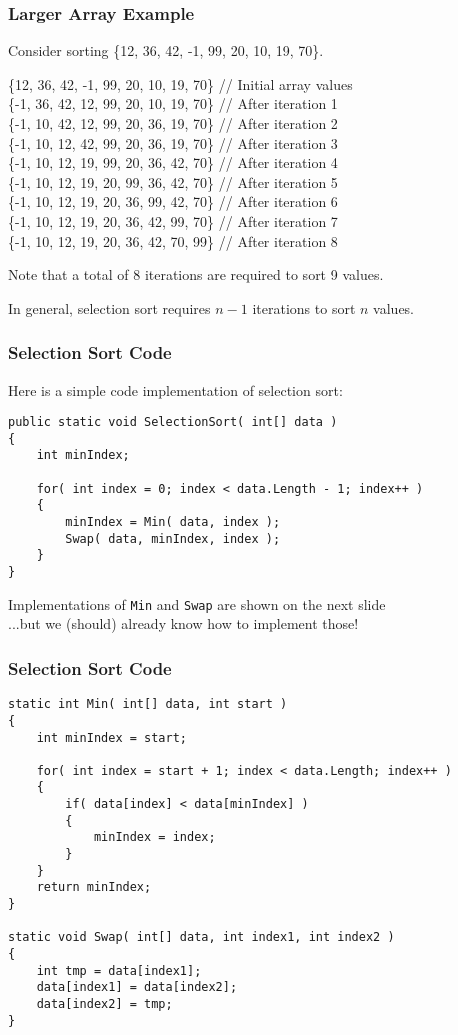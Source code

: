 \begin{frame}
\frametitle{Larger Array Example}

Consider sorting \{12, 36, 42, -1, 99, 20, 10, 19, 70\}.

	\{12, 36, 42, -1, 99, 20, 10, 19, 70\} 	// Initial array values\\
	\{\alert{-1}, 36, 42, 12, 99, 20, 10, 19, 70\}	// After iteration 1\\
	\{\alert{-1, 10}, 42, 12, 99, 20, 36, 19, 70\}	// After iteration 2\\
	\{\alert{-1, 10, 12}, 42, 99, 20, 36, 19, 70\}	// After iteration 3\\
	\{\alert{-1, 10, 12, 19}, 99, 20, 36, 42, 70\}	// After iteration 4\\
	\{\alert{-1, 10, 12, 19, 20}, 99, 36, 42, 70\}	// After iteration 5\\
	\{\alert{-1, 10, 12, 19, 20, 36}, 99, 42, 70\}	// After iteration 6\\
	\{\alert{-1, 10, 12, 19, 20, 36, 42}, 99, 70\}	// After iteration 7\\
	\{\alert{-1, 10, 12, 19, 20, 36, 42, 70, 99}\}	// After iteration 8

Note that a total of 8 iterations are required to sort 9 values.

In general, selection sort requires $n-1$ iterations to sort $n$ values.


\end{frame}

\begin{frame}[fragile]
\frametitle{Selection Sort Code}

Here is a simple code implementation of selection sort:

\begin{verbatim}
public static void SelectionSort( int[] data )
{
    int minIndex;

    for( int index = 0; index < data.Length - 1; index++ )
    {
        minIndex = Min( data, index );
        Swap( data, minIndex, index );
    }
}
\end{verbatim}

Implementations of \texttt{Min} and \texttt{Swap} are shown on the next slide\\ \quad ...but we (should) already know how to implement those!

\end{frame}

\begin{frame}[fragile]
\frametitle{Selection Sort Code}

{\scriptsize
\begin{verbatim}
static int Min( int[] data, int start )
{
    int minIndex = start;
		
    for( int index = start + 1; index < data.Length; index++ )
    {
        if( data[index] < data[minIndex] )
        {
            minIndex = index;
        }
    }
    return minIndex;
}

static void Swap( int[] data, int index1, int index2 )
{
    int tmp = data[index1];
    data[index1] = data[index2];
    data[index2] = tmp;
}
\end{verbatim}
}
\end{frame}

